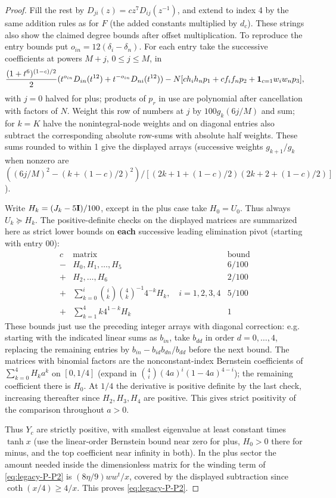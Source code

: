 \begin{proof}
Fill the rest by \(D_{ji}(z)=c z^7 D_{ij}(z^{-1})\), and extend to index 4 by the same addition rules as for \(F\) (the added constants multiplied by \(d_c\)). These strings also show the claimed degree bounds after offset multiplication. To reproduce the entry bounds put \(o_{in}=12(\delta_i-\delta_n)\). For each entry take the successive coefficients at powers \(M+j\), \(0\le j\le M\), in
\[
 \frac{(1+t^6)^{(1-c)/2}}{2}
 (t^{o_{in}}D_{in}(t^{12})+t^{-o_{in}}D_{ni}(t^{12}))-
 N[c h_i h_n p_1+c f_i f_n p_2+{\bf1}_{c=1}w_i w_n p_3],
\]
with \(j=0\) halved for plus; products of \(p_r\) in use are polynomial after cancellation with factors of \(N\). Weight this row of numbers at \(j\) by \(100 g_k(6j/M)\) and sum; for \(k=K\) halve the nonintegral-node weights and on diagonal entries also subtract the corresponding absolute row-sums with absolute half weights. These sums rounded to within 1 give the displayed arrays (successive weights \(g_{k+1}/g_k\) when nonzero are \(((6j/M)^2-(k+(1-c)/2)^2)/[(2k+1+(1-c)/2)(2k+2+(1-c)/2)]\)).

Write \(H_k=(J_k-5{\bf I})/100\), except in the plus case take \(H_0=U_0\). Thus always \(U_k\succeq H_k\). The positive-definite checks on the displayed matrices are summarized here as strict lower bounds on \textbf{each} successive leading elimination pivot (starting with entry \(00\)):
\[
\begin{array}{c|l|l}
 c&\text{matrix}&\text{bound}\\\hline
 -&H_0,H_1,\ldots,H_5& 6/100\\
 +&H_2,\ldots,H_6&2/100\\
 +&\displaystyle\sum_{k=0}^i \binom{i}{k}\binom4k^{-1}4^{-k}H_k,\quad i=1,2,3,4&5/100\\
 +&\displaystyle\sum_{k=1}^4 k4^{1-k}H_k&1
\end{array}
\]
These bounds just use the preceding integer arrays with diagonal correction: e.g. starting with the indicated linear sums as \(b_{in}\), take \(b_{dd}\) in order \(d=0,\ldots,4\), replacing the remaining entries by \(b_{in}-b_{id}b_{dn}/b_{dd}\) before the next bound. The matrices with binomial factors are the nonconstant-index Bernstein coefficients of \(\sum_{k=0}^4 H_k a^k\) on \([0,1/4]\) (expand in \(\binom4i(4a)^i(1-4a)^{4-i}\)); the remaining coefficient there is \(H_0\). At \(1/4\) the derivative is positive definite by the last check, increasing thereafter since \(H_2,H_3,H_4\) are positive. This gives strict positivity of the comparison throughout \(a>0\).

Thus \(Y_c\) are strictly positive, with smallest eigenvalue at least constant times \(\tanh x\) (use the linear-order Bernstein bound near zero for plus, \(H_0>0\) there for minus, and the top coefficient near infinity in both). In the plus sector the amount needed inside the dimensionless matrix for the winding term of \eqref{eq:legacy-P-P2} is \((8\eta/9)ww^t/x\), covered by the displayed subtraction since \(\coth(x/4)\ge4/x\). This proves \eqref{eq:legacy-P-P2}.


\end{proof}

